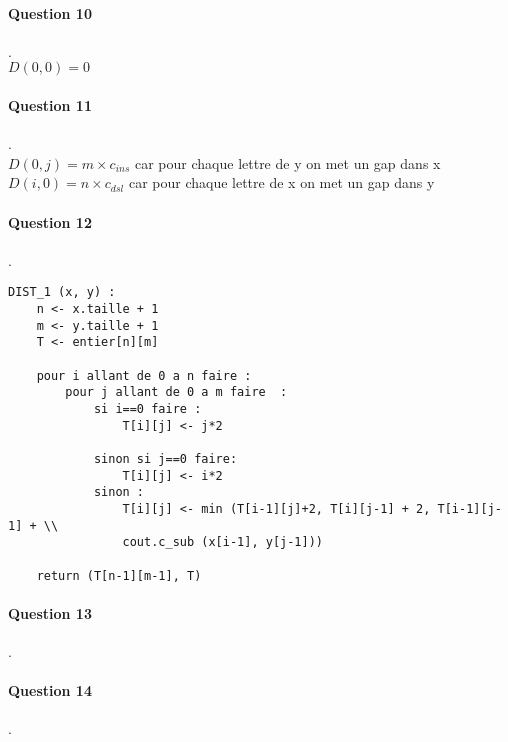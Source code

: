 \paragraph{Question 10}.\\
 $D(0, 0) = 0$
\paragraph{Question 11}.\\
$D(0, j) = m\times c_{ins} $ car pour chaque lettre de y on met un gap dans x\\
$D(i, 0) = n\times c_{dsl} $ car pour chaque lettre de x on met un gap dans y
\paragraph{Question 12}.\\
\begin{lstlisting}
DIST_1 (x, y) :
    n <- x.taille + 1
    m <- y.taille + 1
    T <- entier[n][m]

    pour i allant de 0 a n faire :
        pour j allant de 0 a m faire  :
            si i==0 faire :
                T[i][j] <- j*2

            sinon si j==0 faire:
                T[i][j] <- i*2
            sinon :
                T[i][j] <- min (T[i-1][j]+2, T[i][j-1] + 2, T[i-1][j-1] + \\
                cout.c_sub (x[i-1], y[j-1]))

    return (T[n-1][m-1], T)
\end{lstlisting}
\paragraph{Question 13}.\\
\paragraph{Question 14}.\\
